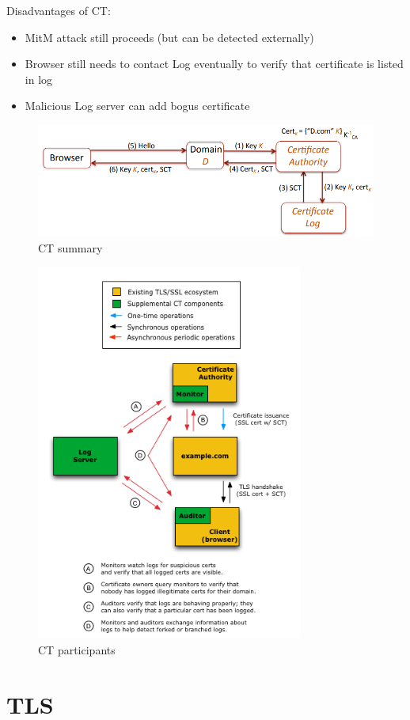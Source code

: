 \documentclass[11pt,oneside,a4paper]{article}
\begin{document}
Disadvantages of CT:

\vspace{-\topsep}
\begin{itemize}
	\setlength{\itemsep}{0pt}
	\setlength{\parskip}{0pt}
	\item MitM attack still proceeds (but can be detected externally)
	\item Browser still needs to contact Log eventually to verify that certificate is listed in log
	\item Malicious Log server can add bogus certificate
\end{itemize}
\vspace{-\topsep}

\begin{figure}[hb]
	\centering
	\includegraphics[width=0.6\linewidth]{figures/ct_summary}
	\caption{CT summary}
	\label{fig:ctsummary}
\end{figure}

\begin{figure}[hb]
	\centering
	\includegraphics[width=0.5\linewidth]{figures/ct_participants}
	\caption{CT participants}
	\label{fig:ctparticipants}
\end{figure}



\newpage

\section{TLS}
\end{document}
